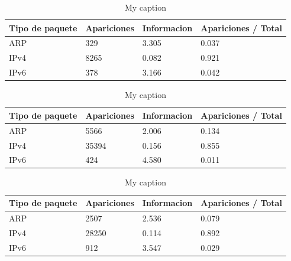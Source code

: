 
\begin{table}[H]
\centering
\caption{My caption}
\label{my-label}
\begin{tabular}{@{}llll@{}}
\toprule
Tipo de paquete & Apariciones & Informacion & Apariciones / Total \\ \midrule
ARP             & 329         & 3.305       & 0.037               \\
IPv4            & 8265        & 0.082       & 0.921               \\
IPv6            & 378         & 3.166       & 0.042               \\ \bottomrule
\end{tabular}
\end{table}


\begin{table}[H]
\centering
\caption{My caption}
\label{my-label}
\begin{tabular}{@{}llll@{}}
\toprule
Tipo de paquete & Apariciones & Informacion & Apariciones / Total \\ \midrule
ARP             & 5566        & 2.006       & 0.134               \\
IPv4            & 35394       & 0.156       & 0.855               \\
IPv6            & 424         & 4.580       & 0.011               \\ \bottomrule
\end{tabular}
\end{table}


\begin{table}[H]
\centering
\caption{My caption}
\label{my-label}
\begin{tabular}{@{}llll@{}}
\toprule
Tipo de paquete & Apariciones & Informacion & Apariciones / Total \\ \midrule
ARP             & 2507        & 2.536       & 0.079               \\
IPv4            & 28250       & 0.114       & 0.892               \\
IPv6            & 912         & 3.547       & 0.029               \\ \bottomrule
\end{tabular}
\end{table}

